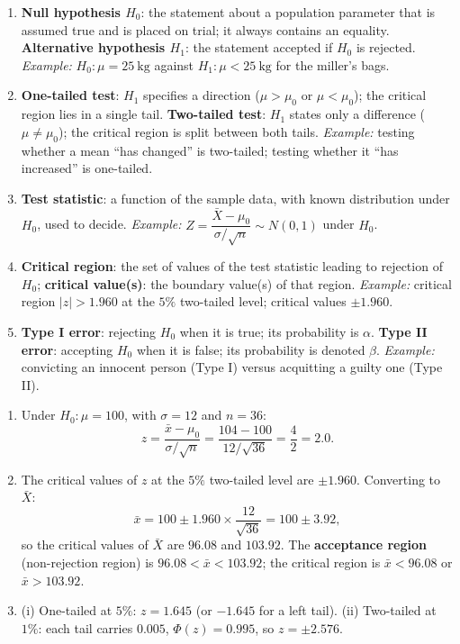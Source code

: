 \documentclass[11pt]{article}
\begin{document}
\begin{corrige}
\begin{enumerate}
\item \textbf{Null hypothesis $H_0$}: the statement about a population parameter that is assumed true and is placed on trial; it always contains an equality. \textbf{Alternative hypothesis $H_1$}: the statement accepted if $H_0$ is rejected. \emph{Example:} $H_0:\mu=25\ \mathrm{kg}$ against $H_1:\mu<25\ \mathrm{kg}$ for the miller's bags.
\item \textbf{One-tailed test}: $H_1$ specifies a direction ($\mu>\mu_0$ or $\mu<\mu_0$); the critical region lies in a single tail. \textbf{Two-tailed test}: $H_1$ states only a difference ($\mu\neq\mu_0$); the critical region is split between both tails. \emph{Example:} testing whether a mean ``has changed'' is two-tailed; testing whether it ``has increased'' is one-tailed.
\item \textbf{Test statistic}: a function of the sample data, with known distribution under $H_0$, used to decide. \emph{Example:} $Z=\dfrac{\bar{X}-\mu_0}{\sigma/\sqrt{n}}\sim N(0,1)$ under $H_0$.
\item \textbf{Critical region}: the set of values of the test statistic leading to rejection of $H_0$; \textbf{critical value(s)}: the boundary value(s) of that region. \emph{Example:} critical region $|z|>1.960$ at the $5\%$ two-tailed level; critical values $\pm 1.960$.
\item \textbf{Type I error}: rejecting $H_0$ when it is true; its probability is $\alpha$. \textbf{Type II error}: accepting $H_0$ when it is false; its probability is denoted $\beta$. \emph{Example:} convicting an innocent person (Type I) versus acquitting a guilty one (Type II).
\end{enumerate}
\end{corrige}

\begin{corrige}
\begin{enumerate}
\item Under $H_0:\mu=100$, with $\sigma=12$ and $n=36$:
\[ z=\frac{\bar{x}-\mu_0}{\sigma/\sqrt{n}}=\frac{104-100}{12/\sqrt{36}}=\frac{4}{2}=2.0. \]
\item The critical values of $z$ at the $5\%$ two-tailed level are $\pm 1.960$. Converting to $\bar{X}$:
\[ \bar{x}=100\pm 1.960\times\frac{12}{\sqrt{36}}=100\pm 3.92, \]
so the critical values of $\bar{X}$ are $96.08$ and $103.92$. The \textbf{acceptance region} (non-rejection region) is $96.08<\bar{x}<103.92$; the critical region is $\bar{x}<96.08$ or $\bar{x}>103.92$.
\item (i) One-tailed at $5\%$: $z=1.645$ (or $-1.645$ for a left tail). (ii) Two-tailed at $1\%$: each tail carries $0.005$, $\Phi(z)=0.995$, so $z=\pm 2.576$.
\end{enumerate}
\end{corrige}
\end{document}
